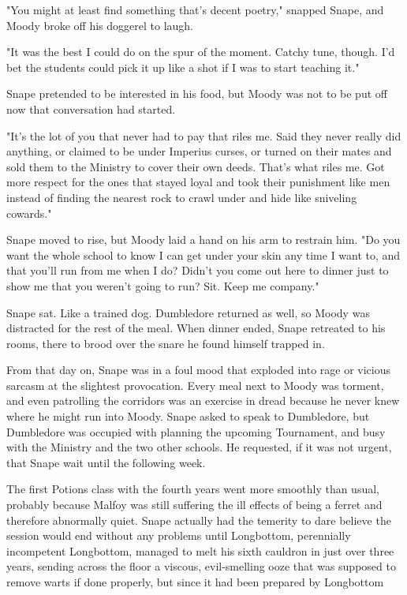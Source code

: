 \lbreak

"You might at least find something that's decent poetry," snapped Snape, and Moody broke off his doggerel to laugh.

"It was the best I could do on the spur of the moment. Catchy tune, though. I'd bet the students could pick it up like a shot if I was to start teaching it."

Snape pretended to be interested in his food, but Moody was not to be put off now that conversation had started.

"It's the lot of you that never had to pay that riles me. Said they never really did anything, or claimed to be under Imperius curses, or turned on their mates and sold them to the Ministry to cover their own deeds. That's what riles me. Got more respect for the ones that stayed loyal and took their punishment like men instead of finding the nearest rock to crawl under and hide like sniveling cowards."

Snape moved to rise, but Moody laid a hand on his arm to restrain him. "Do you want the whole school to know I can get under your skin any time I want to, and that you'll run from me when I do? Didn't you come out here to dinner just to show me that you weren't going to run? Sit. Keep me company."

Snape sat. Like a trained dog. Dumbledore returned as well, so Moody was distracted for the rest of the meal. When dinner ended, Snape retreated to his rooms, there to brood over the snare he found himself trapped in.

From that day on, Snape was in a foul mood that exploded into rage or vicious sarcasm at the slightest provocation. Every meal next to Moody was torment, and even patrolling the corridors was an exercise in dread because he never knew where he might run into Moody. Snape asked to speak to Dumbledore, but Dumbledore was occupied with planning the upcoming Tournament, and busy with the Ministry and the two other schools. He requested, if it was not urgent, that Snape wait until the following week.

The first Potions class with the fourth years went more smoothly than usual, probably because Malfoy was still suffering the ill effects of being a ferret and therefore abnormally quiet. Snape actually had the temerity to dare believe the session would end without any problems until Longbottom, perennially incompetent Longbottom, managed to melt his sixth cauldron in just over three years, sending across the floor a viscous, evil-smelling ooze that was supposed to remove warts if done properly, but since it had been prepared by Longbottom{\el}

